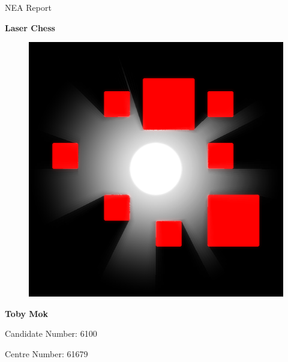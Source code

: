 \documentclass{report}
\begin{document}
\pagestyle{fancy}


\fancyfoot[L]{\leftmark}
\fancyfoot[C]{\thepage}
\fancyfoot[R]{\rightmark}

\begin{titlepage}
\begin{center}
\vspace*{1cm}

\LARGE
NEA Report

\vspace*{0.5cm}
{\fontsize{40}{50}\selectfont \textbf{Laser Chess}}

\vspace*{1.5cm}

\begin{figure}[H]
    \centering
    \includegraphics[width=0.5\columnwidth]{../main/assets/thumbnail.png}
\end{figure}

\vfill

\normalsize
\textbf{Toby Mok}

Candidate Number: 6100

Centre Number: 61679

\end{center}
\end{titlepage}

\newpage
\tableofcontents










\appendix


\end{document}

